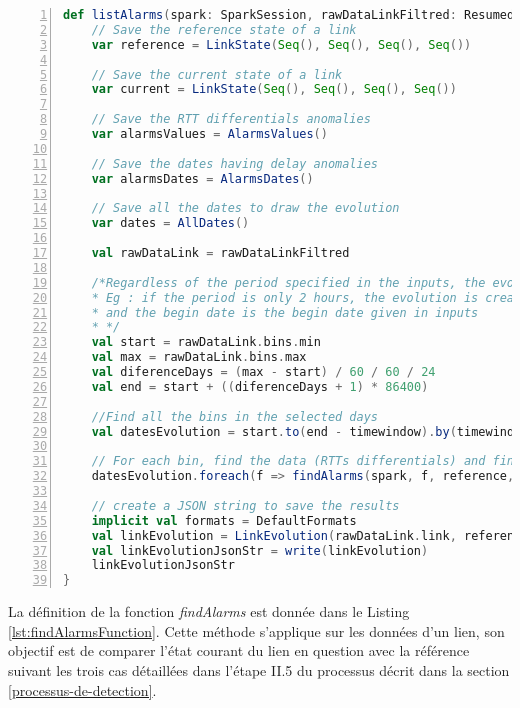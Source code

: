 \begin{lstlisting}[language=scala,firstnumber=1, caption={Définition de la méthode listAlarms},label={lst:findAnalomalies}, basicstyle = \footnotesize,escapechar=|,numbers=left,
stepnumber=1]
  def listAlarms(spark: SparkSession, rawDataLinkFiltred: ResumedLink, timewindow: Int, rangeDates: Seq[Int]): String = {
	// Save the reference state of a link
	var reference = LinkState(Seq(), Seq(), Seq(), Seq())
	
	// Save the current state of a link
	var current = LinkState(Seq(), Seq(), Seq(), Seq())
	
	// Save the RTT differentials anomalies
	var alarmsValues = AlarmsValues()
	
	// Save the dates having delay anomalies
	var alarmsDates = AlarmsDates()
	
	// Save all the dates to draw the evolution 
	var dates = AllDates()
	
	val rawDataLink = rawDataLinkFiltred
	
	/*Regardless of the period specified in the inputs, the evolution is created for one or more days
	* Eg : if the period is only 2 hours, the evolution is created for 24 hours,
	* and the begin date is the begin date given in inputs
	* */
	val start = rawDataLink.bins.min
	val max = rawDataLink.bins.max
	val diferenceDays = (max - start) / 60 / 60 / 24
	val end = start + ((diferenceDays + 1) * 86400)
	
	//Find all the bins in the selected days
	val datesEvolution = start.to(end - timewindow).by(timewindow)
	
	// For each bin, find the data (RTTs differentials) and find alarms
	datesEvolution.foreach(f => findAlarms(spark, f, reference, rawDataLink, current, alarmsDates, alarmsValues, dates))
	
	// create a JSON string to save the results
	implicit val formats = DefaultFormats
	val linkEvolution = LinkEvolution(rawDataLink.link, reference, current, alarmsDates.dates, alarmsValues.medians, dates.dates)
	val linkEvolutionJsonStr = write(linkEvolution)
	linkEvolutionJsonStr
}
\end{lstlisting}

La définition de la fonction \textit{findAlarms} est donnée dans le Listing \ref{lst:findAlarmsFunction}. Cette méthode s'applique sur les données d'un lien,
son objectif  est de comparer l'état courant du lien en question avec la référence suivant les trois cas détaillées dans l'étape II.5 du processus décrit dans la section \ref{processus-de-detection}.


